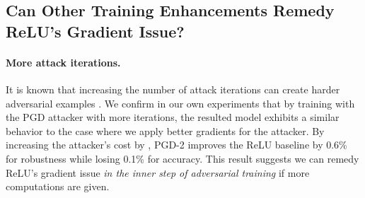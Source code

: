 \documentclass{article}
\begin{document}
\begin{table}[t!]
\centering
{}
\caption{\textbf{ReLU significantly weakens adversarial training}. By improving gradient quality for either the adversarial attacker or the network optimizer, the resulted model obtains better robustness than ReLU baseline. The best robustness can be achieved by adopting better gradients for both the attacker and the network optimizer.}
\label{tab:motivation}
\vspace{-1.5em}
\end{table}



\subsection{Can Other Training Enhancements Remedy ReLU's Gradient Issue?}
\paragraph{More attack iterations.} It is known that increasing the number of attack iterations can create harder adversarial examples \cite{Madry2018}.
We confirm in our own experiments that by training with the PGD attacker with more iterations, the resulted model exhibits a similar behavior to the case where we apply better gradients for the attacker. By increasing the attacker's cost by , PGD-2 improves the ReLU baseline by 0.6\% for robustness while losing 0.1\% for accuracy. This result suggests we can remedy ReLU's gradient issue \emph{in the inner step of adversarial training} if more computations are given.
\end{document}
